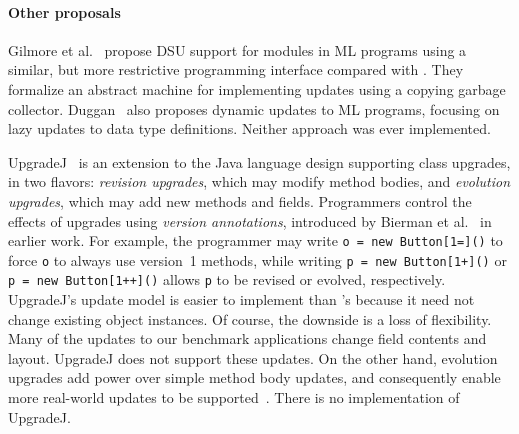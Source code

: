 \paragraph*{Other proposals}

Gilmore et al.~\cite{GilmoreKW97} propose DSU support for modules in
ML programs using a similar, but more restrictive programming interface
compared with \DSU{}.  They formalize an abstract machine for
implementing updates using a copying garbage collector.
Duggan~\cite{DBLP:journals/acta/Duggan05} also proposes dynamic
updates to ML programs, focusing on lazy updates to data type
definitions.  Neither approach was ever implemented.

UpgradeJ~\cite{bierman08upgradej} is an extension to
the Java language design supporting class upgrades, in two flavors:
\emph{revision upgrades}, which may modify method bodies, and
\emph{evolution upgrades}, which may add new methods and fields.
Programmers control the effects of upgrades using \emph{version
annotations}, introduced by Bierman et al.~\cite{BiermanHSS03} in
earlier work.  For 
example, the programmer may write \texttt{o = new 
Button[1=]()} to force \texttt{o} to always use version~1 methods,
while writing \texttt{p = new Button[1+]()} or \texttt{p = new
  Button[1++]()} allows \texttt{p} to be revised or evolved,
respectively.  UpgradeJ's update model is easier to implement than
\DSU's because it need not change existing object instances.  Of
course, the downside is a loss of flexibility.  Many of the updates to
our benchmark applications change field contents and layout.  UpgradeJ does not support these updates.  On the other hand,
evolution upgrades add power over simple method
body updates, and consequently enable more real-world updates to be
supported~\cite{tempero08upgradej}.  There is no implementation of
UpgradeJ.








